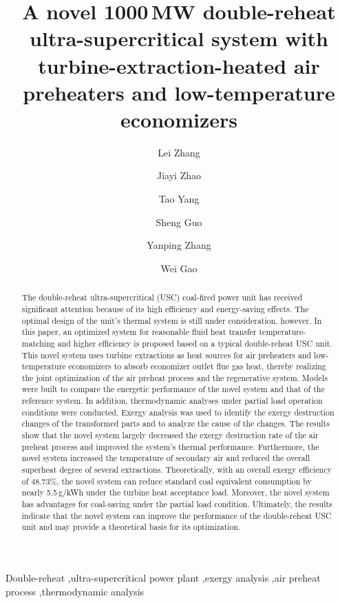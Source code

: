\documentclass[preprint,12pt]{elsarticle}
\begin{document}
\begin{frontmatter}



\title{A novel 1000\,MW double-reheat ultra-supercritical system with turbine-extraction-heated air preheaters and low-temperature economizers}


\author[hust,ncst]{Lei Zhang}
\author[hust]{Jiayi Zhao}
\author[hust]{Tao Yang}
\author[hust]{Sheng Guo}
\author[hust]{Yanping Zhang}
\author[hust]{Wei Gao}


\address[hust]{School of Energy and Power Engineering, Huazhong University of Science and Technology, Wuhan 430074, China}
\address[ncst]{College of Metallurgy and Energy, North China University of Science and Technology, Tangshan 063009, China}

\begin{abstract}
The double-reheat ultra-supercritical (USC) coal-fired power unit has received significant attention because of its high efficiency and energy-saving effects.
The optimal design of the unit's thermal system is still under consideration, however.
In this paper, an optimized system for reasonable fluid heat transfer temperature-matching and higher efficiency is proposed based on a typical double-reheat USC unit.
This novel system uses turbine extractions as heat sources for air preheaters and low-temperature economizers to absorb economizer outlet flue gas heat, thereby realizing the joint optimization of the air preheat process and the regenerative system.
Models were built to compare the energetic performance of the novel system and that of the reference system.
In addition, thermodynamic analyses under partial load operation conditions were conducted. 
Exergy analysis was used to identify the exergy destruction changes of the transformed parts and to analyze the cause of the changes.
The results show that the novel system largely decreased the exergy destruction rate of the air preheat process and improved the system's thermal performance.
Furthermore, the novel system increased the temperature of secondary air and reduced the overall superheat degree of several extractions.
Theoretically, with an overall exergy efficiency of 48.73\%, the novel system can reduce standard coal equivalent consumption by nearly 5.5\,g/kWh under the turbine heat acceptance load.
Moreover, the novel system has advantages for coal-saving under the partial load condition.
Ultimately, the results indicate that the novel system can improve the performance of the double-reheat USC unit and may provide a theoretical basis for its optimization.

\end{abstract}

\begin{keyword}
Double-reheat \sep ultra-supercritical power plant \sep exergy analysis \sep air preheat process \sep thermodynamic analysis
\end{keyword}

\end{frontmatter}
\end{document}
